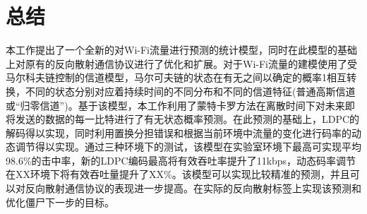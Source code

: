 
\chapter{总结}
\label{chap:conclusion}

本工作提出了一个全新的对Wi-Fi流量进行预测的统计模型，同时在此模型的基础上对原有的反向散射通信协议进行了优化和扩展。对于Wi-Fi流量的建模使用了受马尔科夫链控制的信道模型，马尔可夫链的状态在有无之间以确定的概率1相互转换，不同的状态分别对应着持续时间的不同分布和不同的信道特征(普通高斯信道或“归零信道”)。基于该模型，本工作利用了蒙特卡罗方法在离散时间下对未来即将发送的数据的每一比特进行了有无状态概率预测。在此预测的基础上，LDPC的解码得以实现，同时利用置换分担错误和根据当前环境中流量的变化进行码率的动态调节得以实现。通过三种环境下的测试，该模型在实验室环境下最高可实现平均98.6\%的击中率，新的LDPC编码最高将有效吞吐率提升了11kbps，动态码率调节在XX环境下将有效吞吐量提升了XX\%。该模型可以实现比较精准的预测，并且可以对反向散射通信协议的表现进一步提高。在实际的反向散射标签上实现该预测和优化僵尸下一步的目标。
